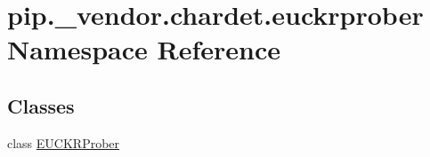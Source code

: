 \hypertarget{namespacepip_1_1__vendor_1_1chardet_1_1euckrprober}{}\section{pip.\+\_\+vendor.\+chardet.\+euckrprober Namespace Reference}
\label{namespacepip_1_1__vendor_1_1chardet_1_1euckrprober}
\subsection*{Classes}
\begin{DoxyCompactItemize}
\item 
class \hyperlink{classpip_1_1__vendor_1_1chardet_1_1euckrprober_1_1EUCKRProber}{E\+U\+C\+K\+R\+Prober}
\end{DoxyCompactItemize}
